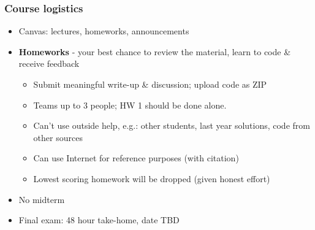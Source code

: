 \documentclass[bigger]{beamer}
\begin{document}
\begin{frame}%
\frametitle{Course logistics}

\begin{itemize}
\item Canvas: lectures, homeworks, announcements

\item \textbf{Homeworks} - your best chance to review the material, learn to
code \& receive feedback

\begin{itemize}
\item Submit meaningful write-up \& discussion; upload code as ZIP

\item Teams up to 3 people; HW 1 should be done alone.

\item Can't use outside help, e.g.: other students, last year solutions, 
\newline
code from other sources

\item Can use Internet for reference purposes (with citation)

\item Lowest scoring homework will be dropped (given honest effort)
\end{itemize}

\item No midterm

\item Final exam: 48 hour take-home, date TBD
\end{itemize}

\end{frame}
\end{document}
